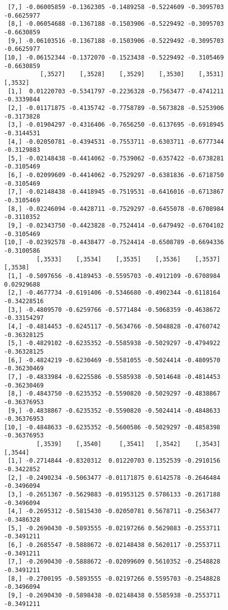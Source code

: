 \documentclass[
  letterpaper,
  DIV=11,
  numbers=noendperiod]{scrreprt}
\begin{document}
\begin{verbatim}
 [7,] -0.06005859 -0.1362305 -0.1489258 -0.5224609 -0.3095703 -0.6625977
 [8,] -0.06054688 -0.1367188 -0.1503906 -0.5229492 -0.3095703 -0.6630859
 [9,] -0.06103516 -0.1367188 -0.1503906 -0.5229492 -0.3095703 -0.6625977
[10,] -0.06152344 -0.1372070 -0.1523438 -0.5229492 -0.3105469 -0.6630859
          [,3527]    [,3528]    [,3529]    [,3530]    [,3531]    [,3532]
 [1,]  0.01220703 -0.5341797 -0.2236328 -0.7563477 -0.4741211 -0.3339844
 [2,] -0.01171875 -0.4135742 -0.7758789 -0.5673828 -0.5253906 -0.3173828
 [3,] -0.01904297 -0.4316406 -0.7656250 -0.6137695 -0.6918945 -0.3144531
 [4,] -0.02050781 -0.4394531 -0.7553711 -0.6303711 -0.6777344 -0.3129883
 [5,] -0.02148438 -0.4414062 -0.7539062 -0.6357422 -0.6738281 -0.3105469
 [6,] -0.02099609 -0.4414062 -0.7529297 -0.6381836 -0.6718750 -0.3105469
 [7,] -0.02148438 -0.4418945 -0.7519531 -0.6416016 -0.6713867 -0.3105469
 [8,] -0.02246094 -0.4428711 -0.7529297 -0.6455078 -0.6708984 -0.3110352
 [9,] -0.02343750 -0.4423828 -0.7524414 -0.6479492 -0.6704102 -0.3105469
[10,] -0.02392578 -0.4438477 -0.7524414 -0.6508789 -0.6694336 -0.3100586
         [,3533]    [,3534]    [,3535]    [,3536]    [,3537]     [,3538]
 [1,] -0.5097656 -0.4189453 -0.5595703 -0.4912109 -0.6708984  0.02929688
 [2,] -0.4677734 -0.6191406 -0.5346680 -0.4902344 -0.6118164 -0.34228516
 [3,] -0.4809570 -0.6259766 -0.5771484 -0.5068359 -0.4638672 -0.33154297
 [4,] -0.4814453 -0.6245117 -0.5634766 -0.5048828 -0.4760742 -0.36328125
 [5,] -0.4829102 -0.6235352 -0.5585938 -0.5029297 -0.4794922 -0.36328125
 [6,] -0.4824219 -0.6230469 -0.5581055 -0.5024414 -0.4809570 -0.36230469
 [7,] -0.4833984 -0.6225586 -0.5585938 -0.5014648 -0.4814453 -0.36230469
 [8,] -0.4843750 -0.6235352 -0.5590820 -0.5029297 -0.4838867 -0.36376953
 [9,] -0.4838867 -0.6235352 -0.5590820 -0.5024414 -0.4848633 -0.36376953
[10,] -0.4848633 -0.6235352 -0.5600586 -0.5029297 -0.4858398 -0.36376953
         [,3539]    [,3540]     [,3541]   [,3542]    [,3543]    [,3544]
 [1,] -0.2714844 -0.8320312  0.01220703 0.1352539 -0.2910156 -0.3422852
 [2,] -0.2490234 -0.5063477 -0.01171875 0.6142578 -0.2646484 -0.3496094
 [3,] -0.2651367 -0.5629883 -0.01953125 0.5786133 -0.2617188 -0.3496094
 [4,] -0.2695312 -0.5815430 -0.02050781 0.5678711 -0.2563477 -0.3486328
 [5,] -0.2690430 -0.5893555 -0.02197266 0.5629883 -0.2553711 -0.3491211
 [6,] -0.2685547 -0.5888672 -0.02148438 0.5620117 -0.2553711 -0.3491211
 [7,] -0.2690430 -0.5888672 -0.02099609 0.5610352 -0.2548828 -0.3491211
 [8,] -0.2700195 -0.5893555 -0.02197266 0.5595703 -0.2548828 -0.3496094
 [9,] -0.2690430 -0.5898438 -0.02148438 0.5585938 -0.2553711 -0.3491211

\end{verbatim}
\end{document}
